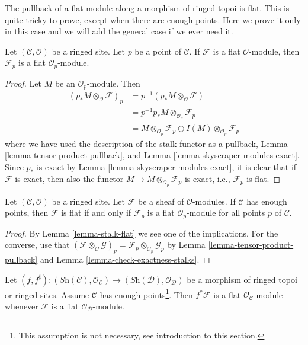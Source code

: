 \noindent
The pullback of a flat module along a morphism of ringed topoi
is flat. This is quite tricky to prove, except when there are
enough points. Here we prove it only in this case and we will add
the general case if we ever need it.

\begin{lemma}
\label{lemma-stalk-flat}
Let $(\mathcal{C}, \mathcal{O})$ be a ringed site.
Let $p$ be a point of $\mathcal{C}$.
If $\mathcal{F}$ is a flat $\mathcal{O}$-module, then
$\mathcal{F}_p$ is a flat $\mathcal{O}_p$-module.
\end{lemma}

\begin{proof}
Let $M$ be an $\mathcal{O}_p$-module. Then
\begin{align*}
(p_*M \otimes_{\mathcal{O}} \mathcal{F})_p & =
p^{-1}(p_*M \otimes_{\mathcal{O}} \mathcal{F}) \\
& = p^{-1}p_*M \otimes_{\mathcal{O}_p} \mathcal{F}_p \\
& = M \otimes_{\mathcal{O}_p} \mathcal{F}_p \oplus
I(M) \otimes_{\mathcal{O}_p} \mathcal{F}_p
\end{align*}
where we have used the description of the stalk functor as a pullback,
Lemma \ref{lemma-tensor-product-pullback}, and
Lemma \ref{lemma-skyscraper-modules-exact}.
Since $p_*$ is exact by
Lemma \ref{lemma-skyscraper-modules-exact},
it is clear that if $\mathcal{F}$ is exact, then
also the functor $M \mapsto M \otimes_{\mathcal{O}_p} \mathcal{F}_p$
is exact, i.e., $\mathcal{F}_p$ is flat.
\end{proof}

\begin{lemma}
\label{lemma-check-flat-stalks}
Let $(\mathcal{C}, \mathcal{O})$ be a ringed site.
Let $\mathcal{F}$ be a sheaf of $\mathcal{O}$-modules.
If $\mathcal{C}$ has enough points, then
$\mathcal{F}$ is flat if and only if $\mathcal{F}_p$ is
a flat $\mathcal{O}_p$-module for all points $p$ of $\mathcal{C}$.
\end{lemma}

\begin{proof}
By
Lemma \ref{lemma-stalk-flat}
we see one of the implications.
For the converse, use that
$(\mathcal{F} \otimes_{\mathcal{O}} \mathcal{G})_p =
\mathcal{F}_p \otimes_{\mathcal{O}_p} \mathcal{G}_p$
by
Lemma \ref{lemma-tensor-product-pullback}
and
Lemma \ref{lemma-check-exactness-stalks}.
\end{proof}

\begin{lemma}
\label{lemma-pullback-flat}
Let
$(f, f^\sharp) :
(\textit{Sh}(\mathcal{C}), \mathcal{O}_{\mathcal{C}})
\to
(\textit{Sh}(\mathcal{D}), \mathcal{O}_{\mathcal{D}})$
be a morphism of ringed topoi or ringed sites.
Assume $\mathcal{C}$ has enough points\footnote{This assumption is
not necessary, see introduction to this section.}.
Then $f^*\mathcal{F}$ is a flat $\mathcal{O}_{\mathcal{C}}$-module
whenever $\mathcal{F}$ is a flat $\mathcal{O}_{\mathcal{D}}$-module.
\end{lemma}

